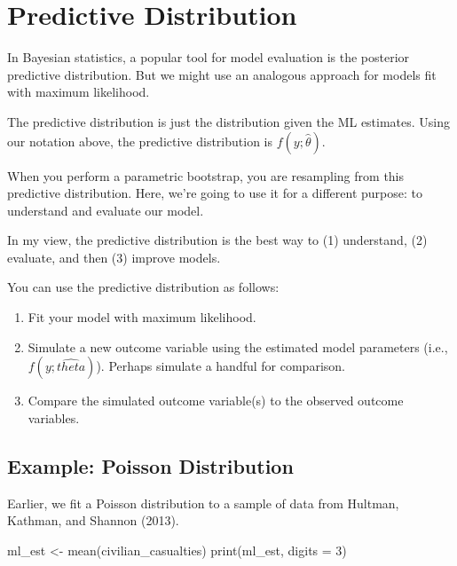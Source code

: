 \documentclass[
]{book}
\newenvironment{Shaded}{\begin{snugshade}}{\end{snugshade}}
\newcommand{\AttributeTok}[1]{\textcolor[rgb]{0.77,0.63,0.00}{#1}}
\newcommand{\DecValTok}[1]{\textcolor[rgb]{0.00,0.00,0.81}{#1}}
\newcommand{\FunctionTok}[1]{\textcolor[rgb]{0.00,0.00,0.00}{#1}}
\newcommand{\NormalTok}[1]{#1}
\newcommand{\OtherTok}[1]{\textcolor[rgb]{0.56,0.35,0.01}{#1}}
\providecommand{\tightlist}{%
  \setlength{\itemsep}{0pt}\setlength{\parskip}{0pt}}
\begin{document}
\hypertarget{predictive-distribution}{%
\section{Predictive Distribution}\label{predictive-distribution}}

In Bayesian statistics, a popular tool for model evaluation is the
posterior predictive distribution. But we might use an analogous
approach for models fit with maximum likelihood.

The predictive distribution is just the distribution given the ML
estimates. Using our notation above, the predictive distribution is
\(f(y; \hat{\theta})\).

When you perform a parametric bootstrap, you are resampling from this
predictive distribution. Here, we're going to use it for a different
purpose: to understand and evaluate our model.

In my view, the predictive distribution is the best way to (1)
understand, (2) evaluate, and then (3) improve models.

You can use the predictive distribution as follows:

\begin{enumerate}
\def\labelenumi{\arabic{enumi}.}
\tightlist
\item
  Fit your model with maximum likelihood.
\item
  Simulate a new outcome variable using the estimated model parameters
  (i.e., \(f(y; \hat{theta})\)). Perhaps simulate a handful for
  comparison.
\item
  Compare the simulated outcome variable(s) to the observed outcome
  variables.
\end{enumerate}

\hypertarget{example-poisson-distribution-2}{%
\subsection{Example: Poisson
Distribution}\label{example-poisson-distribution-2}}

Earlier, we fit a Poisson distribution to a sample of data from Hultman,
Kathman, and Shannon (2013).

\begin{Shaded}
\begin{Highlighting}[]
\NormalTok{ml\_est }\OtherTok{\textless{}{-}} \FunctionTok{mean}\NormalTok{(civilian\_casualties)}
\FunctionTok{print}\NormalTok{(ml\_est, }\AttributeTok{digits =} \DecValTok{3}\NormalTok{)}
\end{Highlighting}
\end{Shaded}
\end{document}
